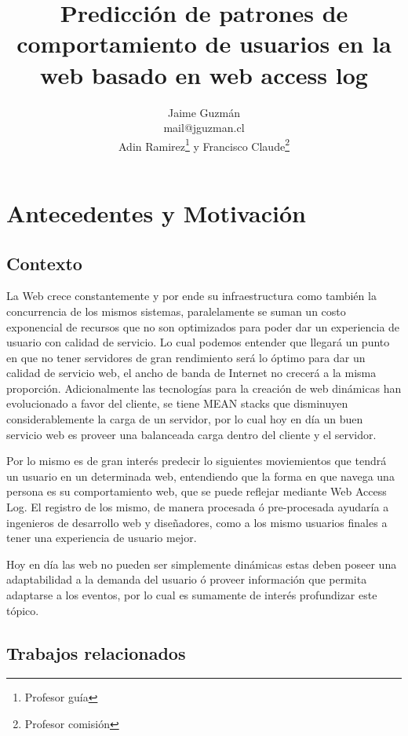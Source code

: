 \documentclass{udparticle}
\title{ Predicción de patrones de comportamiento de usuarios en la web basado en web access log}
\author{  
  Jaime Guzmán\\{\small\ttfamily mail@jguzman.cl}\protect\\[5pt]%
  {\small Adin Ramirez\thanks{Profesor guía} y Francisco Claude\thanks{Profesor comisión}}%
  }
\begin{document}
\maketitle

\section{Antecedentes y Motivación}

\subsection{Contexto}


  La Web crece constantemente y por ende su infraestructura como también la concurrencia de los mismos sistemas, paralelamente se suman un costo exponencial de recursos que no son optimizados para poder dar un experiencia de usuario con calidad de servicio.
  Lo cual podemos entender que llegará un punto en que no tener servidores de gran rendimiento será lo óptimo para dar un calidad de servicio web, el ancho de banda de Internet no crecerá a la misma proporción. Adicionalmente las tecnologías para la creación de  web dinámicas han evolucionado a favor del cliente, se tiene MEAN stacks que disminuyen considerablemente la carga de un servidor, por lo cual hoy en día un buen servicio web  es proveer una balanceada carga dentro del cliente y el servidor.

  Por lo mismo es de gran interés predecir lo siguientes moviemientos que tendrá un usuario en un determinada web, entendiendo que la forma en que navega una persona es su comportamiento web, que se puede reflejar mediante Web Access Log. El registro de los mismo, de manera procesada ó pre-procesada ayudaría a ingenieros de desarrollo web y diseñadores, como a los mismo usuarios finales a tener una experiencia de usuario mejor.
  
  Hoy en día las web no pueden ser simplemente dinámicas estas deben poseer una adaptabilidad a la demanda del usuario ó proveer información que permita adaptarse a los eventos, por lo cual es sumamente de interés profundizar este tópico.








 

\subsection{Trabajos relacionados}
\end{document}
